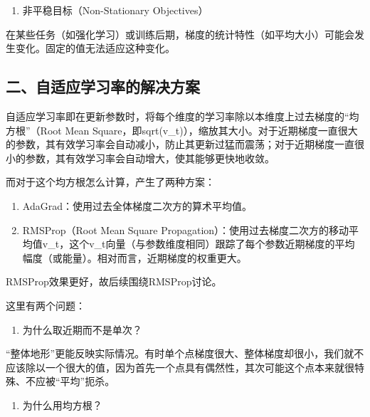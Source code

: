 \begin{enumerate}
\def\labelenumi{\arabic{enumi}.}
\setcounter{enumi}{1}
\tightlist
\item
  非平稳目标（Non-Stationary Objectives）
\end{enumerate}

在某些任务（如强化学习）或训练后期，梯度的统计特性（如平均大小）可能会发生变化。固定的值无法适应这种变化。

\hypertarget{ux4e8cux81eaux9002ux5e94ux5b66ux4e60ux7387ux7684ux89e3ux51b3ux65b9ux6848}{%
\subsection{二、自适应学习率的解决方案}\label{ux4e8cux81eaux9002ux5e94ux5b66ux4e60ux7387ux7684ux89e3ux51b3ux65b9ux6848}}

自适应学习率即在更新参数时，将每个维度的学习率除以本维度上过去梯度的``均方根''（Root Mean Square，即sqrt(v\_t)），缩放其大小。对于近期梯度一直很大的参数，其有效学习率会自动减小，防止其更新过猛而震荡；对于近期梯度一直很小的参数，其有效学习率会自动增大，使其能够更快地收敛。

而对于这个均方根怎么计算，产生了两种方案：

\begin{enumerate}
\def\labelenumi{\arabic{enumi}.}
\item
  AdaGrad：使用过去全体梯度二次方的算术平均值。
\item
  RMSProp（Root Mean Square Propagation）：使用过去梯度二次方的移动平均值v\_t，这个v\_t向量（与参数维度相同）跟踪了每个参数近期梯度的平均幅度（或能量）。相对而言，近期梯度的权重更大。
\end{enumerate}

RMSProp效果更好，故后续围绕RMSProp讨论。

这里有两个问题：

\begin{enumerate}
\def\labelenumi{\arabic{enumi}.}
\tightlist
\item
  为什么取近期而不是单次？
\end{enumerate}

``整体地形''更能反映实际情况。有时单个点梯度很大、整体梯度却很小，我们就不应该除以一个很大的值，因为首先一个点具有偶然性，其次可能这个点本来就很特殊、不应被``平均''扼杀。

\begin{enumerate}
\def\labelenumi{\arabic{enumi}.}
\setcounter{enumi}{1}
\tightlist
\item
  为什么用均方根？
\end{enumerate}


